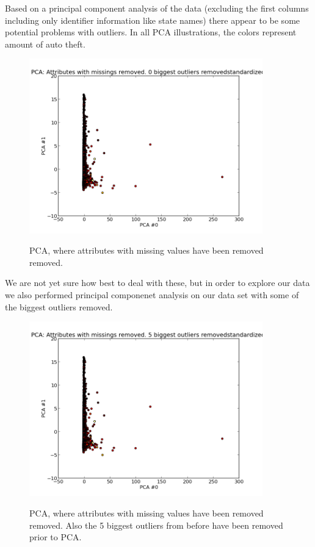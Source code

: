 Based on a principal component analysis of the data (excluding the first columns including only identifier information like state names) there appear to be some potential problems with outliers. In all PCA illustrations, the colors represent amount of auto theft.

\begin{figure}[H]
\centering
\includegraphics[width=0.9\textwidth]{pca/attr-with-missings-removed_0-biggest-outliers-removed_standrd_}
\label{fig:prenorm_attrrem_0out}
\caption{PCA, where attributes with missing values have been removed removed.}
\end{figure}

We are not yet sure how best to deal with these, but in order to explore our data we also performed principal componenet analysis on our data set with some of the biggest outliers removed.

\begin{figure}[H]
\centering
\includegraphics[width=0.9\textwidth]{pca/attr-with-missings-removed_5-biggest-outliers-removed_standrd_}
\label{fig:prenorm_attrrem_0out}
\caption{PCA, where attributes with missing values have been removed removed. Also the 5 biggest outliers from before have been removed prior to PCA.}
\end{figure}

